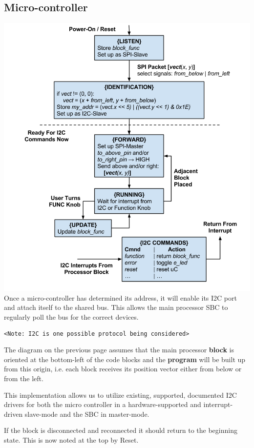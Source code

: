 \subsection{Micro-controller}

\includegraphics[width=6in]{uC_state.png}
Once a micro-controller has determined its address, it will enable its I2C port and attach itself to the shared bus. This allows the main processor SBC to regularly poll the bus for the correct devices.
\begin{verbatim}
<Note: I2C is one possible protocol being considered>
\end{verbatim}
The diagram on the previous page assumes that the main processor \textbf{block} is oriented at the bottom-left of the code blocks and the \textbf{program} will be built up from this origin, i.e. each block receives its position vector either from below or from the left. 


This implementation allows us to utilize existing, supported, documented I2C drivers for both the micro controller in a hardware-supported and interrupt-driven slave-mode and the SBC in master-mode.

If the block is disconnected and reconnected it should return to the beginning state. This is now noted at the top by Reset.

